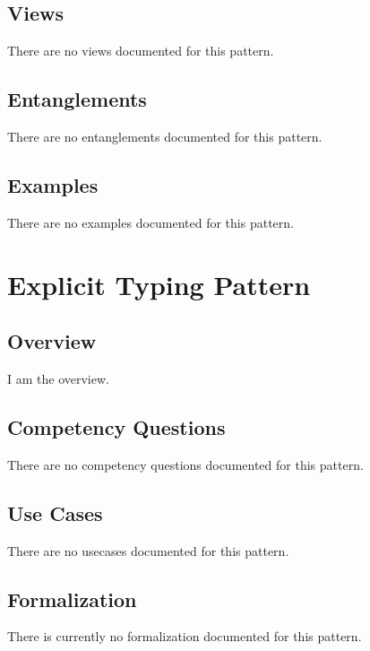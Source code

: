 \subsection{Views}
\label{ssec:views}
There are no views documented for this pattern.


\subsection{Entanglements}
\label{ssec:entanglements}
There are no entanglements documented for this pattern.

\subsection{Examples}
\label{ssec:examples}
There are no examples documented for this pattern.


\section{Explicit Typing Pattern}
\label{sec:explicit-typing-pattern}
\subsection{Overview}
\label{ssec:overview}
I am the overview.

\subsection{Competency Questions}
\label{ssec:cqs}
There are no competency questions documented for this pattern.

\subsection{Use Cases}
\label{ssec:use-cases}
There are no usecases documented for this pattern.
\subsection{Formalization}
\label{ssec:formalization}
There is currently no formalization documented for this pattern.

